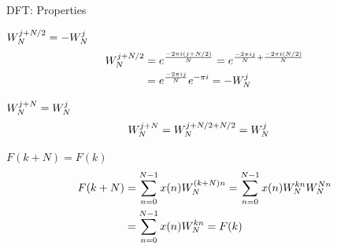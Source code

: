 \begin{myframe}{DFT: Properties}

\vspace{-5px}

\begin{block}{\centering $W_N^{j+N/2}=-W_N^{j}$}
\begin{align*}
W_N^{j+N/2} &= e^{ \frac{-2 \pi i (j+N/2)}{ N} } 
           = e^{ \frac{-2 \pi i j}{ N} + \frac{-2 \pi i (N/2)}{ N} }\\
           &= e^{ \frac{-2 \pi i j}{ N}} e^{-\pi i} 
            = -W_N^{j}  
\end{align*}
\end{block}

\vspace{-5px}

\begin{block}{\centering $W_N^{j+N}=W_N^{j}$}
\begin{align*}
W_N^{j+N} &= W_N^{j+N/2+N/2}  = W_N^{j}
\end{align*}
\end{block}

\vspace{-5px}

\begin{block}{\centering $F(k+N)=F(k)$}
\begin{align*}
F(k+N)&= \sum_{n=0}^{N-1} x(n) W_N^{(k+N)n} = \sum_{n=0}^{N-1} x(n) W_N^{kn} W_N^{Nn}\\
 &=\sum_{n=0}^{N-1} x(n) W_N^{kn} = F(k)
\end{align*}
\end{block}
\end{myframe}

